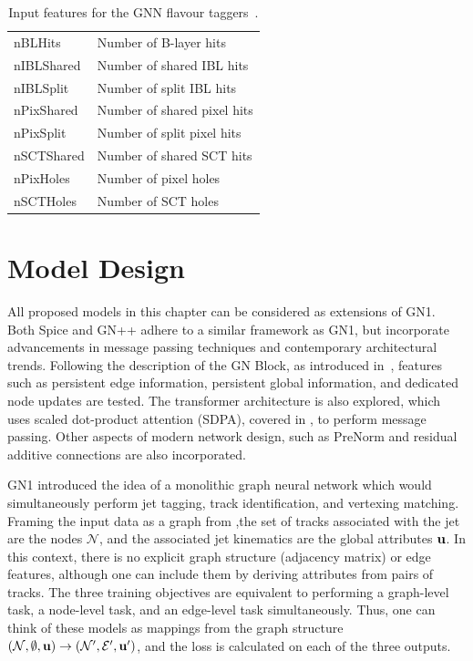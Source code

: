 \begin{table}[h]
\begin{tabular}{ll}
        nBLHits           & Number of B-layer hits                                              \\
        nIBLShared        & Number of shared IBL hits                                           \\
        nIBLSplit         & Number of split IBL hits                                            \\
        nPixShared        & Number of shared pixel hits                                         \\
        nPixSplit         & Number of split pixel hits                                          \\
        nSCTShared        & Number of shared SCT hits                                           \\
        nPixHoles         & Number of pixel holes                                               \\
        nSCTHoles         & Number of SCT holes                                                 \\
        \bottomrule
    \end{tabular}
    \caption{Input features for the GNN flavour taggers~\cite{GN1}.}
    \label{tab:track_features}
\end{table}

\section{Model Design}

All proposed models in this chapter can be considered as extensions of \Gls{GN1}.
Both Spice and \Gls{GN++} adhere to a similar framework as \Gls{GN1}, but incorporate advancements in message passing techniques and contemporary architectural trends.
Following the description of the GN Block, as introduced in~\textcite{RelationalInductiveBiases}, features such as persistent edge information, persistent global information, and dedicated node updates are tested.
The transformer architecture is also explored, which uses scaled dot-product attention (SDPA), covered in , to perform message passing.
Other aspects of modern network design, such as PreNorm and residual additive connections are also incorporated.

\Gls{GN1} introduced the idea of a monolithic graph neural network which would simultaneously perform jet tagging, track identification, and vertexing matching.
Framing the input data as a graph from ,the set of tracks associated with the jet are the nodes $\mathcal{N}$, and the associated jet kinematics are the global attributes $\mathbf{u}$.
In this context, there is no explicit graph structure (adjacency matrix) or edge features, although one can include them by deriving attributes from pairs of tracks.
The three training objectives are equivalent to performing a graph-level task, a node-level task, and an edge-level task simultaneously.
Thus, one can think of these models as mappings from the graph structure $(\mathcal{N}, \emptyset, \mathbf{u}) \rightarrow (\mathcal{N}', \mathcal{E}', \mathbf{u}')$, and the loss is calculated on each of the three outputs.

